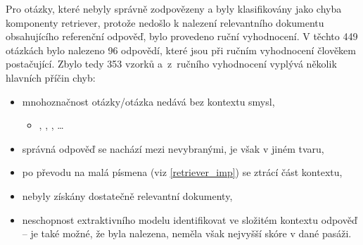 Pro otázky, které nebyly správně zodpovězeny a byly klasifikovány jako chyba komponenty retriever, protože nedošlo k nalezení relevantního dokumentu obsahujícího referenční odpověď, bylo provedeno ruční vyhodnocení. V těchto 449 otázkách bylo nalezeno 96 odpovědí, které jsou při ručním vyhodnocení člověkem postačující. Zbylo tedy 353 vzorků a~z~ručního vyhodnocení vyplývá několik hlavních příčin chyb:
\begin{itemize}
\setlength\itemsep{0.2em}
    \item mnohoznačnost otázky/otázka nedává bez kontextu smysl,
    \begin{itemize}
        \item {}, , , \dots
    \end{itemize}
    \item správná odpověď se nachází mezi nevybranými, je však v jiném tvaru,
    \item po převodu na malá písmena (viz \ref{retriever_imp}) se ztrácí část kontextu,
    \item nebyly získány dostatečně relevantní dokumenty,
    \item neschopnost extraktivního modelu identifikovat ve složitém kontextu odpověď -- je také možné, že byla nalezena, neměla však nejvyšší skóre v dané pasáži.
\end{itemize}


